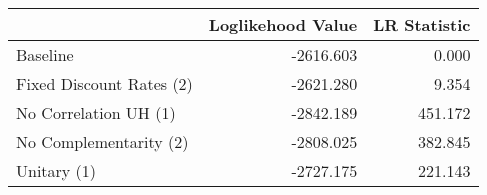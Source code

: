 \begin{tabular}{lrr}
\toprule
{} & Loglikehood Value & LR Statistic \\
\midrule
Baseline                 &         -2616.603 &        0.000 \\
Fixed Discount Rates (2) &         -2621.280 &        9.354 \\
No Correlation UH (1)    &         -2842.189 &      451.172 \\
No Complementarity (2)   &         -2808.025 &      382.845 \\
Unitary (1)              &         -2727.175 &      221.143 \\
\bottomrule
\end{tabular}
